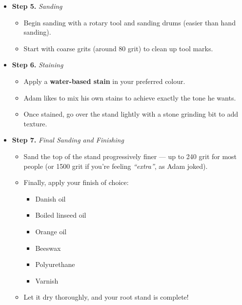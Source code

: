 \begin{itemize}
    \item \textbf{Step 5.} \textit{Sanding}
    \begin{itemize}
        \item Begin sanding with a rotary tool and sanding drums (easier than hand sanding).
        
        \item Start with coarse grits (around 80 grit) to clean up tool marks.
    \end{itemize}

    \item \textbf{Step 6.} \textit{Staining}
    \begin{itemize}
        \item Apply a \textbf{water\--based stain} in your preferred colour.
        
        \item Adam likes to mix his own stains to achieve exactly the tone he wants.
        
        \item Once stained, go over the stand lightly with a stone grinding bit to add texture.
    \end{itemize}

    \item \textbf{Step 7.} \textit{Final Sanding and Finishing}
    \begin{itemize}
        \item Sand the top of the stand progressively finer --- up to 240 grit for most people (or 1500 grit if you're feeling \textit{``extra''}, as Adam joked).
        
        \item Finally, apply your finish of choice:
        \begin{itemize}
            \item[\tiny$\blacksquare$] Danish oil
            \item[\tiny$\blacksquare$] Boiled linseed oil
            \item[\tiny$\blacksquare$] Orange oil
            \item[\tiny$\blacksquare$] Beeswax
            \item[\tiny$\blacksquare$] Polyurethane
            \item[\tiny$\blacksquare$] Varnish
        \end{itemize}
        
        \item Let it dry thoroughly, and your root stand is complete!
    \end{itemize}
\end{itemize}

